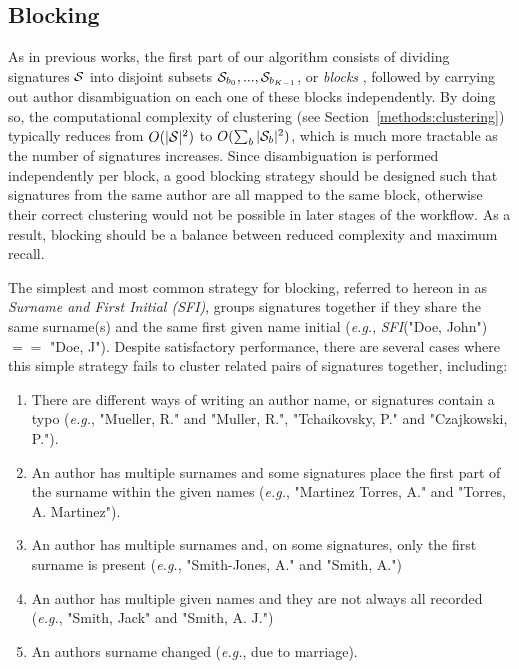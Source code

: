 \documentclass[conference]{IEEEtran}
\newcommand{\eg}{\emph{e.g.}\xspace}
\begin{document}
\subsection{Blocking}
\label{methods:blocking}

As in previous works, the first part of our algorithm consists of dividing
signatures ${\cal S}$ into disjoint subsets ${\cal S}_{b_0}, ..., {\cal
S}_{b_{K-1}}$, or \textit{blocks} \cite{fellegi69}, followed by carrying out
author disambiguation on each one of these blocks independently.
By doing so, the computational complexity of clustering (see Section~\ref{methods:clustering})
typically reduces from $O(|{\cal S}|^2)$ to $O(\sum_b |{\cal S}_b|^2)$, which is much more
tractable as the number of signatures increases.
Since disambiguation is performed independently per block, a good blocking strategy should be
designed such that signatures from the same author are all mapped to the same
block, otherwise their correct clustering would not be possible in later stages of the workflow.
As a result, blocking should be a balance between reduced complexity and maximum recall.

The simplest and most common strategy for blocking, referred to hereon in as \textit{Surname and First Initial (SFI)},
groups signatures together if they share the same surname(s) and the same first
given name initial (\eg, \emph{SFI}("Doe, John") $==$ "Doe, J").
Despite satisfactory performance, there are several cases where this simple strategy fails to cluster related pairs of signatures together, including:

\begin{enumerate}
  \item There are different
  ways of writing an author name, or signatures contain a typo
  (\eg, "Mueller, R." and "Muller, R.", "Tchaikovsky, P." and "Czajkowski, P.").

  \item An author has multiple surnames and some signatures place the first part of the surname within the given names (\eg, "Martinez Torres, A." and "Torres, A. Martinez").

  \item An author has multiple surnames and, on some signatures, only the first surname is
  present (\eg, "Smith-Jones, A." and "Smith, A.")

  \item An author has multiple given names and they are not always all recorded (\eg,
  "Smith, Jack" and "Smith, A. J.")

  \item An authors surname changed (\eg, due to marriage).
\end{enumerate}
\end{document}
